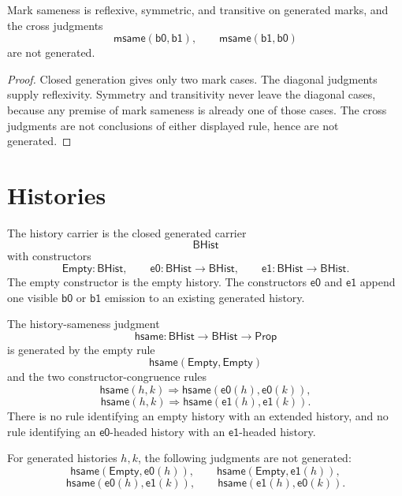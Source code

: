 \begin{theorem}
\label{thm:kernel-spine-mark-sameness-diagonal}
Mark sameness is reflexive, symmetric, and transitive on generated marks,
and the cross judgments
$$
\mathsf{msame}(\mathsf{b0},\mathsf{b1}),
\qquad
\mathsf{msame}(\mathsf{b1},\mathsf{b0})
$$
are not generated.
\end{theorem}

\begin{proof}
Closed generation gives only two mark cases.  The diagonal judgments supply
reflexivity.  Symmetry and transitivity never leave the diagonal cases,
because any premise of mark sameness is already one of those cases.  The
cross judgments are not conclusions of either displayed rule, hence are
not generated.
\end{proof}

\section{Histories}
\label{sec:mark-hist-ext-cont-histories}

\begin{definition}
\label{def:kernel-spine-history-carrier}
The history carrier is the closed generated carrier
$$
\mathsf{BHist}
$$
with constructors
$$
\mathsf{Empty}:\mathsf{BHist},
\qquad
\mathsf{e0}:\mathsf{BHist}\to\mathsf{BHist},
\qquad
\mathsf{e1}:\mathsf{BHist}\to\mathsf{BHist}.
$$
The empty constructor is the empty history.  The constructors
$\mathsf{e0}$ and $\mathsf{e1}$ append one visible $\mathsf{b0}$ or
$\mathsf{b1}$ emission to an existing generated history.
\end{definition}

\begin{definition}
\label{def:kernel-spine-history-sameness}
The history-sameness judgment
$$
\mathsf{hsame}:\mathsf{BHist}\to\mathsf{BHist}\to\mathsf{Prop}
$$
is generated by the empty rule
$$
\mathsf{hsame}(\mathsf{Empty},\mathsf{Empty})
$$
and the two constructor-congruence rules
$$
\mathsf{hsame}(h,k)
\Longrightarrow
\mathsf{hsame}(\mathsf{e0}(h),\mathsf{e0}(k)),
$$
$$
\mathsf{hsame}(h,k)
\Longrightarrow
\mathsf{hsame}(\mathsf{e1}(h),\mathsf{e1}(k)).
$$
There is no rule identifying an empty history with an extended history,
and no rule identifying an $\mathsf{e0}$-headed history with an
$\mathsf{e1}$-headed history.
\end{definition}

\begin{theorem}
\label{thm:kernel-spine-history-no-confusion}
For generated histories $h,k$, the following judgments are not generated:
$$
\mathsf{hsame}(\mathsf{Empty},\mathsf{e0}(h)),
\qquad
\mathsf{hsame}(\mathsf{Empty},\mathsf{e1}(h)),
$$
$$
\mathsf{hsame}(\mathsf{e0}(h),\mathsf{e1}(k)),
\qquad
\mathsf{hsame}(\mathsf{e1}(h),\mathsf{e0}(k)).
$$
\end{theorem}

